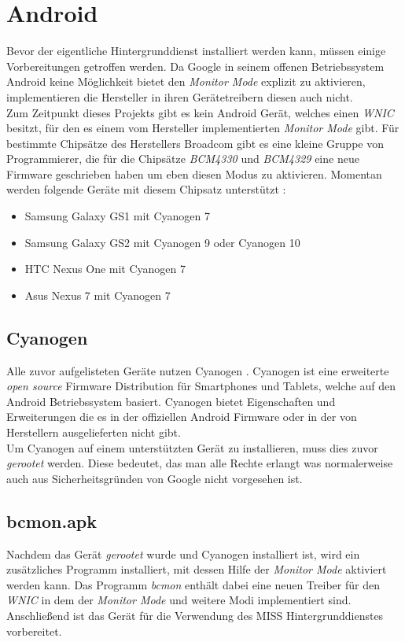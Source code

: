 \documentclass[]{report}
\begin{document}
\section{Android}
Bevor der eigentliche Hintergrunddienst installiert werden kann, müssen einige Vorbereitungen getroffen werden. Da Google in seinem offenen Betriebssystem Android keine Möglichkeit bietet den \textit{Monitor Mode} explizit zu aktivieren, implementieren die Hersteller in ihren Gerätetreibern diesen auch nicht.\\
Zum Zeitpunkt dieses Projekts gibt es kein Android Gerät, welches einen \textit{WNIC} besitzt, für den es einem vom Hersteller implementierten \textit{Monitor Mode} gibt. Für bestimmte Chipsätze des Herstellers Broadcom \cite{Broadcom} gibt es eine kleine Gruppe von Programmierer, die für die Chipsätze \textit{BCM4330} \cite{BCM4330} und \textit{BCM4329} \cite{BCM4329} eine neue Firmware geschrieben haben um eben diesen Modus zu aktivieren. Momentan werden folgende Geräte mit diesem Chipsatz unterstützt \cite{bcmonBlog}:
\begin{itemize}
\item Samsung Galaxy GS1 mit Cyanogen 7
\item Samsung Galaxy GS2 mit Cyanogen 9 oder Cyanogen 10
\item HTC Nexus One mit Cyanogen 7
\item Asus Nexus 7 mit Cyanogen 7
\end{itemize}
\subsection{Cyanogen}
Alle zuvor aufgelisteten Geräte nutzen Cyanogen \cite{Cyanogen}. Cyanogen ist eine erweiterte \textit{open source} Firmware Distribution für Smartphones und Tablets, welche auf den Android Betriebssystem basiert. Cyanogen bietet Eigenschaften und Erweiterungen die es in der offiziellen Android Firmware oder in der von Herstellern ausgelieferten nicht gibt. \\
Um Cyanogen auf einem unterstützten Gerät zu installieren, muss dies zuvor \textit{gerootet} werden. Diese bedeutet, das man alle Rechte erlangt was normalerweise auch aus Sicherheitsgründen von Google nicht vorgesehen ist. 
\subsection{bcmon.apk}
Nachdem das Gerät \textit{gerootet} wurde und Cyanogen installiert ist, wird ein zusätzliches Programm installiert, mit dessen Hilfe der \textit{Monitor Mode} aktiviert werden kann. Das Programm \textit{bcmon} \cite{bcmon.apk} enthält dabei eine neuen Treiber für den \textit{WNIC} in dem der \textit{Monitor Mode} und weitere Modi implementiert sind. Anschließend ist das Gerät für die Verwendung des MISS Hintergrunddienstes vorbereitet. 
\end{document}
